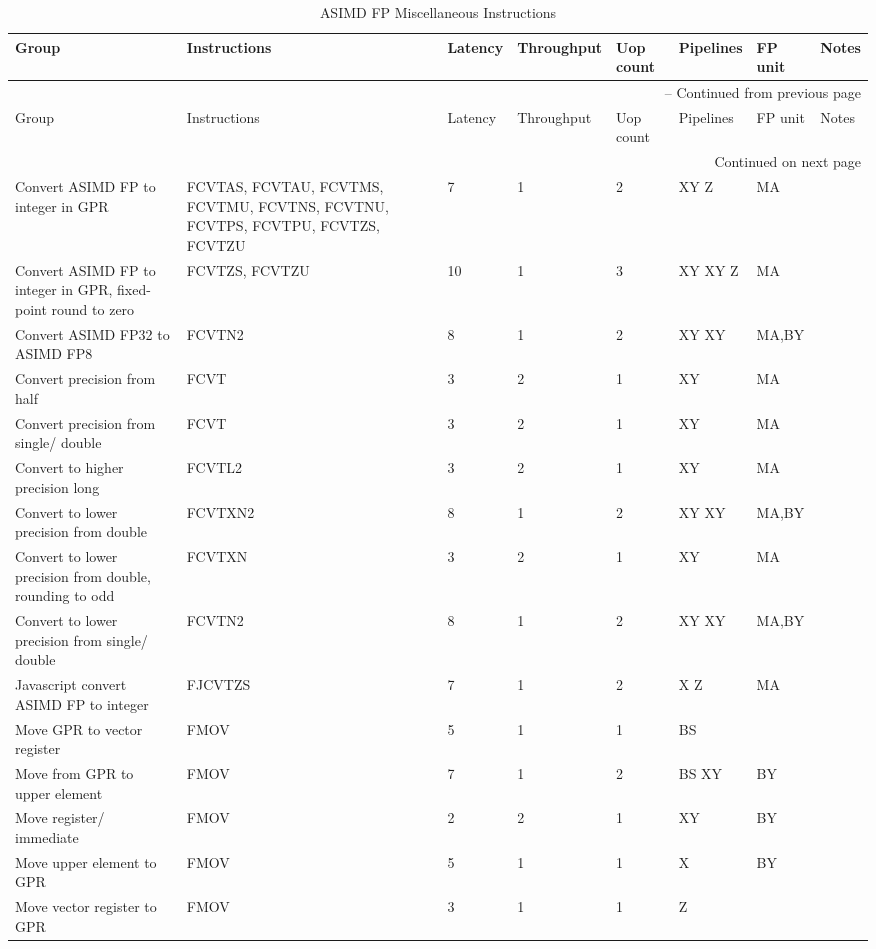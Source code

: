 \begin{longtable}{|p{1in}|p{1in}|l|l|l|p{1in}|l|p{1in}|}
\caption{ASIMD FP Miscellaneous Instructions} \\
\hline
Group & Instructions & Latency & Throughput & Uop count & Pipelines & FP unit & Notes\\
\hline
\endfirsthead
\hline
\multicolumn{8}{|r|}{{\tablename\ \thetable{} -- Continued from previous page}} \\
\hline
Group & Instructions & Latency & Throughput & Uop count & Pipelines & FP unit & Notes\\
\hline
\endhead
\hline
\multicolumn{8}{|r|}{{Continued on next page}} \\
\hline
\endfoot
\hline
\endlastfoot
Convert ASIMD FP to integer in GPR & FCVTAS, FCVTAU, FCVTMS, FCVTMU, FCVTNS, FCVTNU, FCVTPS, FCVTPU, FCVTZS, FCVTZU & 7 & 1 & 2 & XY Z & MA & \\
\hline
Convert ASIMD FP to integer in GPR, fixed-point round to zero & FCVTZS, FCVTZU & 10 & 1 & 3 & XY XY Z & MA & \\
\hline
Convert ASIMD FP32 to ASIMD FP8 & FCVTN{{2}} & 8 & 1 & 2 & XY XY & MA,BY & \\
\hline
Convert precision from half & FCVT & 3 & 2 & 1 & XY & MA & \\
\hline
Convert precision from single/ double & FCVT & 3 & 2 & 1 & XY & MA & \\
\hline
Convert to higher precision long & FCVTL{{2}} & 3 & 2 & 1 & XY & MA & \\
\hline
Convert to lower precision from double & FCVTXN{{2}} & 8 & 1 & 2 & XY XY & MA,BY & \\
\hline
Convert to lower precision from double, rounding to odd & FCVTXN & 3 & 2 & 1 & XY & MA & \\
\hline
Convert to lower precision from single/ double & FCVTN{{2}} & 8 & 1 & 2 & XY XY & MA,BY & \\
\hline
Javascript convert ASIMD FP to integer & FJCVTZS & 7 & 1 & 2 & X Z & MA & \\
\hline
Move GPR to vector register & FMOV & 5 & 1 & 1 & BS &  & \\
\hline
Move from GPR to upper element & FMOV & 7 & 1 & 2 & BS XY & BY & \\
\hline
Move register/ immediate & FMOV & 2 & 2 & 1 & XY & BY & \\
\hline
Move upper element to GPR & FMOV & 5 & 1 & 1 & X & BY & \\
\hline
Move vector register to GPR & FMOV & 3 & 1 & 1 & Z &  & \\
\hline
\end{longtable}
